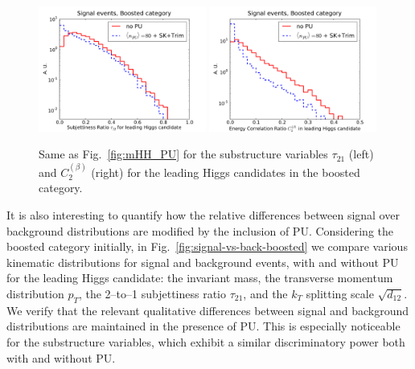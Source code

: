 \begin{figure}[t]
  \begin{center}
    \includegraphics[width=0.49\textwidth]{plots/tau21_h0_bst_comp.pdf}
  \includegraphics[width=0.49\textwidth]{plots/D2_h0_bst_comp.pdf}
    \caption{\small
    Same as Fig.~\ref{fig:mHH_PU} for the
    substructure variables $\tau_{21}$  (left)
     and  $C_2^{(\beta)}$ (right)
     for the leading Higgs candidates in the boosted category.
}
\label{fig:Substructure_PU}
\end{center}
\end{figure}

It is also interesting to quantify how
the relative differences between
signal over background distributions are modified by the inclusion of PU.
%
Considering the boosted category initially,
in Fig.~\ref{fig:signal-vs-back-boosted} we compare
various kinematic distributions for signal and background events,
with and without PU for the leading Higgs candidate: the invariant mass, the transverse
momentum distribution $p_T$,
     the 2--to--1 subjettiness ratio $\tau_{21}$, and 
     the $k_T$ splitting scale $\sqrt{d_{12}}$.
      We verify that the relevant
      qualitative differences between signal
      and background distributions are maintained  in the presence of PU.
      This is especially noticeable for the substructure variables, which
      exhibit a similar discriminatory power both with and without
      PU.
     

